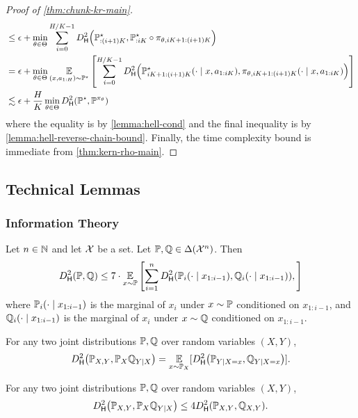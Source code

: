 \begin{proof}[Proof of \cref{thm:chunk-kr-main}]
\begin{align}
&\leq \epsilon + \min_{\theta\in\Theta} \sum_{i=0}^{H/K-1} \Dhels{\BP^\st_{:(i+1)K}}{\BP^\st_{:iK} \circ \pi_{\theta,iK+1:(i+1)K}} \\ 
&= \epsilon + \min_{\theta\in\Theta} \EE_{(x,a_{1:H})\sim\BP^\st}\left[\sum_{i=0}^{H/K-1} \Dhels{\BP^\st_{iK+1:(i+1)K}(\cdot\mid{}x,a_{1:iK})}{\pi_{\theta,iK+1:(i+1)K}(\cdot\mid{}x,a_{1:iK})}\right] \\ 
&\lesssim \epsilon + \frac{H}{K}\min_{\theta\in\Theta} \Dhels{\BP^\st}{\BP^{\pi_\theta}}
\end{align}
where the equality is by \cref{lemma:hell-cond} and the final inequality is by \cref{lemma:hell-reverse-chain-bound}. Finally, the time complexity bound is immediate from \cref{thm:kern-rho-main}.
\end{proof}

\subsection{Technical Lemmas}

\subsubsection{Information Theory}

\begin{lemma}\label{lemma:hell-chain-bound}
Let $n \in \mathbb{N}$ and let $\mathcal{X}$ be a set. Let $\mathbb{P}, \mathbb{Q} \in \Delta(\mathcal{X}^n)$. Then 
\[\Dhels{\BP}{\BQ} \leq 7 \cdot \EE_{x \sim \BP}\left[ \sum_{i=1}^n \Dhels{\BP_i(\cdot\mid{}x_{1:i-1})}{\BQ_i(\cdot\mid{}x_{1:i-1})},\right]\]
where $\mathbb{P}_i(\cdot\mid{}x_{1:i-1})$ is the marginal of $x_i$ under $x \sim \mathbb{P}$ conditioned on $x_{1:i-1}$, and $\mathbb{Q}_i(\cdot\mid{}x_{1:i-1})$ is the marginal of $x_i$ under $x \sim \mathbb{Q}$ conditioned on $x_{1:i-1}$.
\end{lemma}

\begin{lemma}\label{lemma:hell-cond}
For any two joint distributions $\mathbb{P},\mathbb{Q}$ over random variables $(X,Y)$,
\[\Dhels{\BP_{X,Y}}{\BP_X\BQ_{Y\mid{}X}} = \EE_{x\sim \BP_X}[\Dhels{\BP_{Y\mid{}X=x}}{\BQ_{Y\mid{}X=x}}].\]
\end{lemma}

\begin{lemma}\label{lemma:hell-reverse-chain-bound}
For any two joint distributions $\mathbb{P},\mathbb{Q}$ over random variables $(X,Y)$,\loose
\[\Dhels{\BP_{X,Y}}{\BP_X\BQ_{Y\mid{}X}} \leq 4\Dhels{\BP_{X,Y}}{\BQ_{X,Y}}.\]
\end{lemma}

